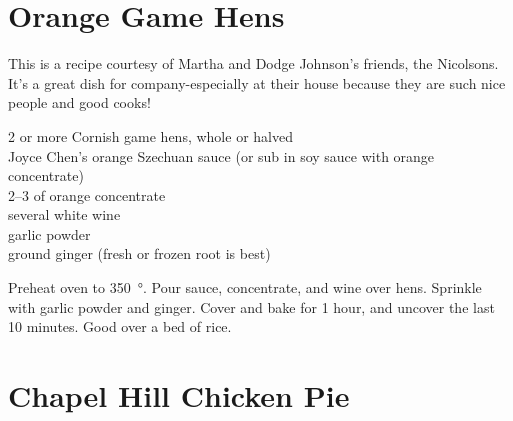 \section{Orange Game Hens}

\begin{open}
  This is a recipe courtesy of Martha and Dodge Johnson's friends, the
  Nicolsons. It's a great dish for company-especially at their house because
  they are such nice people and good cooks!
\end{open}
\begin{ingredients}
  2 or more Cornish game hens, whole or halved\\
  Joyce Chen's orange Szechuan sauce (or sub in soy sauce with orange
  concentrate)\\
  \SIrange{2}{3}{\tblspoon} of orange concentrate\\
  several \si{\tblspoon} white wine\\
  garlic powder\\
  ground ginger (fresh or frozen root is best)
\end{ingredients}
Preheat oven to \SI{350}{\degree}. Pour sauce, concentrate, and wine over
hens. Sprinkle with garlic powder and ginger. Cover and bake for
1 hour, and uncover the last 10 minutes. Good over a bed of rice.

\section{Chapel Hill Chicken Pie}

